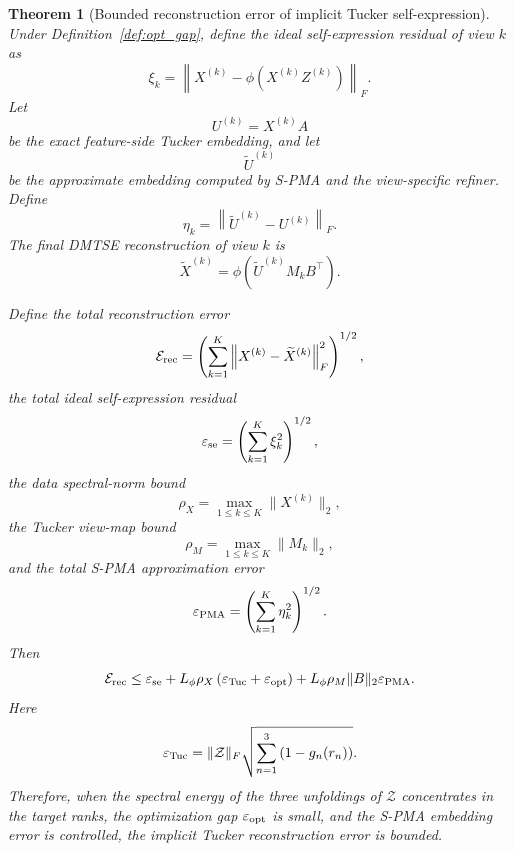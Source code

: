 \documentclass[11pt]{article}
\newtheorem{theorem}{Theorem}
\begin{document}
\begin{theorem}[Bounded reconstruction error of implicit Tucker self-expression]
	\label{thm:implicit_tucker_bounded_error}
	Under Definition~\ref{def:opt_gap}, define the ideal self-expression residual of view $k$ as
	\[
	\xi_k
	=
	\left\|
	X^{(k)}
	-
	\phi\!\left(X^{(k)}Z^{(k)}\right)
	\right\|_F .
	\]
	Let
	\[
	U^{(k)}=X^{(k)}A
	\]
	be the exact feature-side Tucker embedding, and let
	\[
	\widetilde U^{(k)}
	\]
	be the approximate embedding computed by S-PMA and the view-specific refiner. Define
	\[
	\eta_k
	=
	\left\|
	\widetilde U^{(k)}-U^{(k)}
	\right\|_F .
	\]
	The final DMTSE reconstruction of view $k$ is
	\[
	\widetilde X^{(k)}
	=
	\phi\!\left(
	\widetilde U^{(k)}M_kB^\top
	\right).
	\]
	
	Define the total reconstruction error
	\[
	\mathcal E_{\rm rec}
	=
	\left(
	\sum_{k=1}^{K}
	\left\|
	X^{(k)}-\widetilde X^{(k)}
	\right\|_F^2
	\right)^{1/2},
	\]
	the total ideal self-expression residual
	\[
	\varepsilon_{\rm se}
	=
	\left(
	\sum_{k=1}^{K}
	\xi_k^2
	\right)^{1/2},
	\]
	the data spectral-norm bound
	\[
	\rho_X=\max_{1\le k\le K}\|X^{(k)}\|_2,
	\]
	the Tucker view-map bound
	\[
	\rho_M=\max_{1\le k\le K}\|M_k\|_2,
	\]
	and the total S-PMA approximation error
	\[
	\varepsilon_{\rm PMA}
	=
	\left(
	\sum_{k=1}^{K}
	\eta_k^2
	\right)^{1/2}.
	\]
	Then
	\[
	\mathcal E_{\rm rec}
	\le
	\varepsilon_{\rm se}
	+
	L_\phi \rho_X
	\left(
	\varepsilon_{\rm Tuc}
	+
	\varepsilon_{\rm opt}
	\right)
	+
	L_\phi \rho_M \|B\|_2
	\varepsilon_{\rm PMA}.
	\]
	Here
	\[
	\varepsilon_{\rm Tuc}
	=
	\|\mathcal Z\|_F
	\sqrt{
		\sum_{n=1}^{3}
		\left(1-g_n(r_n)\right)
	}.
	\]
	Therefore, when the spectral energy of the three unfoldings of $\mathcal Z$ concentrates in the target ranks, the optimization gap $\varepsilon_{\rm opt}$ is small, and the S-PMA embedding error is controlled, the implicit Tucker reconstruction error is bounded.
\end{theorem}
\end{document}
